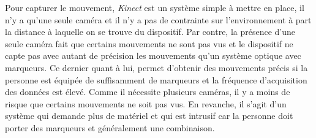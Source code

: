 Pour capturer le mouvement, \emph{Kinect} est un système simple à mettre en place, il n'y a qu'une seule caméra et il n'y a pas de contrainte sur l'environnement à part la distance à laquelle on se trouve du dispositif. Par contre, la présence d'une seule caméra fait que certains mouvements ne sont pas vus et le dispositif ne capte pas avec autant de précision les mouvements qu'un système optique avec marqueurs. Ce dernier quant à lui, permet d'obtenir des mouvements précis si la personne est équipée de suffisamment de marqueurs et la fréquence d'acquisition des données est élevé. Comme il nécessite plusieurs caméras, il y a moins de risque que certains mouvements ne soit pas vus. En revanche, il s'agit d'un système qui demande plus de matériel et qui est intrusif car la personne doit porter des marqueurs et généralement une combinaison.
